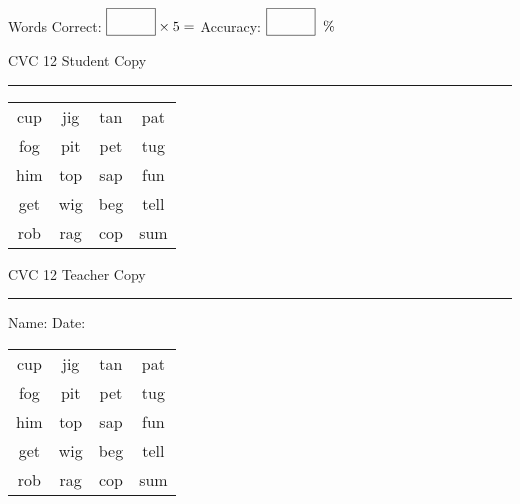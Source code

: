 \documentclass{memoir}
\begin{document}
\normalsize

Words Correct: $\fbox{\phantom{\huge 100}} \times 5 = $ Accuracy: $\fbox{\phantom{\huge 100}}\;\; \%$ 

\vfill

\newpage


\footnotesize \noindent
CVC 12 \hfill Student Copy
\smallskip
\hrule

\huge

\setlength{\tabcolsep}{14pt}
\def\arraystretch{2}

{\selectfont


\begin{vplace}[0.5]
\begin{center}
\begin{tabular}{cccc}
cup & jig & tan & pat \\
fog & pit & pet & tug \\
him & top & sap & fun \\
get & wig & beg & tell \\
rob & rag & cop & sum \\
\end{tabular}
\end{center}
\end{vplace}

}

\newpage

\footnotesize \noindent
CVC 12 \hfill Teacher Copy
\smallskip
\hrule

\normalsize

\vfill

\noindent
Name: \underline{\hspace{1.75in}} \hfill Date: \underline{\hspace{1in}}

\huge

{\selectfont


\begin{vplace}[0.5]
\begin{center}
\begin{tabular}{cccc}
cup & jig & tan & pat \\
fog & pit & pet & tug \\
him & top & sap & fun \\
get & wig & beg & tell \\
rob & rag & cop & sum \\
\end{tabular}
\end{center}
\end{vplace}



}
\end{document}
